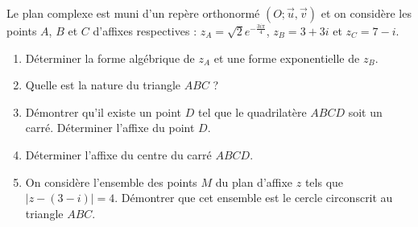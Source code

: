 \documentclass[a4paper,12pt]{article}
\begin{document}
\begin{tcolorbox}[title=Exercice 19]
Le plan complexe est muni d'un repère orthonormé \( (O ; \vec{u}, \vec{v}) \) et on considère les points \( A \), \( B \) et \( C \) d'affixes respectives :  
\( z_A = \sqrt{2}e^{-\frac{3i\pi}{4}} \), \( z_B = 3 + 3i \) et \( z_C = 7 - i \).

\begin{enumerate}
    \item Déterminer la forme algébrique de \( z_A \) et une forme exponentielle de \( z_B \).
    \item Quelle est la nature du triangle \( ABC \) ?
    \item Démontrer qu'il existe un point \( D \) tel que le quadrilatère \( ABCD \) soit un carré. Déterminer l'affixe du point \( D \).
    \item Déterminer l'affixe du centre du carré \( ABCD \).
    \item On considère l'ensemble des points \( M \) du plan d'affixe \( z \) tels que \( |z - (3 - i)| = 4 \). Démontrer que cet ensemble est le cercle circonscrit au triangle \( ABC \).
\end{enumerate}
\end{tcolorbox}
\end{document}
